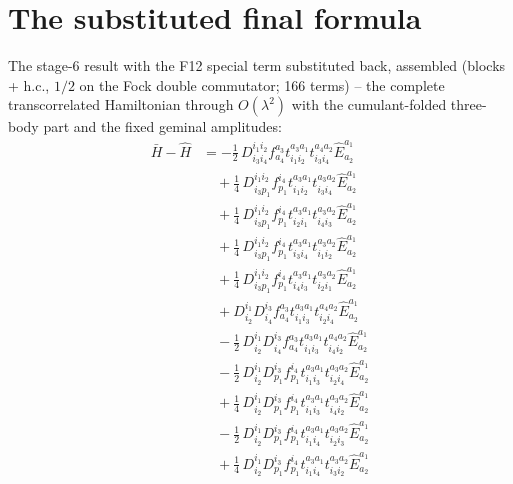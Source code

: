 \documentclass[11pt]{article}
\begin{document}
\section{The substituted final formula}
The stage-6 result with the F12 special term substituted back, assembled (blocks + h.c., $1/2$ on the Fock double commutator; 166 terms) -- the complete transcorrelated Hamiltonian through $O(\lambda^2)$ with the cumulant-folded three-body part and the fixed geminal amplitudes:
\begin{align}
\bar H - \hat H &= - \tfrac{1}{2}\, D^{i_{1}i_{2}}_{i_{3}i_{4}} f^{a_{3}}_{a_{4}} t^{a_{3}a_{1}}_{i_{1}i_{2}} t^{a_{4}a_{2}}_{i_{3}i_{4}} \hat{E}^{a_{1}}_{a_{2}} \\
&\quad + \tfrac{1}{4}\, D^{i_{1}i_{2}}_{i_{3}p_{1}} f^{i_{4}}_{p_{1}} t^{a_{3}a_{1}}_{i_{1}i_{2}} t^{a_{3}a_{2}}_{i_{3}i_{4}} \hat{E}^{a_{1}}_{a_{2}} \\
&\quad + \tfrac{1}{4}\, D^{i_{1}i_{2}}_{i_{3}p_{1}} f^{i_{4}}_{p_{1}} t^{a_{3}a_{1}}_{i_{2}i_{1}} t^{a_{3}a_{2}}_{i_{4}i_{3}} \hat{E}^{a_{1}}_{a_{2}} \\
&\quad + \tfrac{1}{4}\, D^{i_{1}i_{2}}_{i_{3}p_{1}} f^{i_{4}}_{p_{1}} t^{a_{3}a_{1}}_{i_{3}i_{4}} t^{a_{3}a_{2}}_{i_{1}i_{2}} \hat{E}^{a_{1}}_{a_{2}} \\
&\quad + \tfrac{1}{4}\, D^{i_{1}i_{2}}_{i_{3}p_{1}} f^{i_{4}}_{p_{1}} t^{a_{3}a_{1}}_{i_{4}i_{3}} t^{a_{3}a_{2}}_{i_{2}i_{1}} \hat{E}^{a_{1}}_{a_{2}} \\
&\quad + D^{i_{1}}_{i_{2}} D^{i_{3}}_{i_{4}} f^{a_{3}}_{a_{4}} t^{a_{3}a_{1}}_{i_{1}i_{3}} t^{a_{4}a_{2}}_{i_{2}i_{4}} \hat{E}^{a_{1}}_{a_{2}} \\
&\quad - \tfrac{1}{2}\, D^{i_{1}}_{i_{2}} D^{i_{3}}_{i_{4}} f^{a_{3}}_{a_{4}} t^{a_{3}a_{1}}_{i_{1}i_{3}} t^{a_{4}a_{2}}_{i_{4}i_{2}} \hat{E}^{a_{1}}_{a_{2}} \\
&\quad - \tfrac{1}{2}\, D^{i_{1}}_{i_{2}} D^{i_{3}}_{p_{1}} f^{i_{4}}_{p_{1}} t^{a_{3}a_{1}}_{i_{1}i_{3}} t^{a_{3}a_{2}}_{i_{2}i_{4}} \hat{E}^{a_{1}}_{a_{2}} \\
&\quad + \tfrac{1}{4}\, D^{i_{1}}_{i_{2}} D^{i_{3}}_{p_{1}} f^{i_{4}}_{p_{1}} t^{a_{3}a_{1}}_{i_{1}i_{3}} t^{a_{3}a_{2}}_{i_{4}i_{2}} \hat{E}^{a_{1}}_{a_{2}} \\
&\quad - \tfrac{1}{2}\, D^{i_{1}}_{i_{2}} D^{i_{3}}_{p_{1}} f^{i_{4}}_{p_{1}} t^{a_{3}a_{1}}_{i_{1}i_{4}} t^{a_{3}a_{2}}_{i_{2}i_{3}} \hat{E}^{a_{1}}_{a_{2}} \\
&\quad + \tfrac{1}{4}\, D^{i_{1}}_{i_{2}} D^{i_{3}}_{p_{1}} f^{i_{4}}_{p_{1}} t^{a_{3}a_{1}}_{i_{1}i_{4}} t^{a_{3}a_{2}}_{i_{3}i_{2}} \hat{E}^{a_{1}}_{a_{2}} \\

\end{align}
\end{document}
